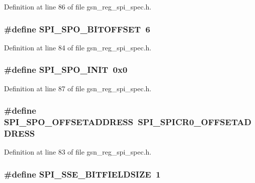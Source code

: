 Definition at line 86 of file gsn\_\-reg\_\-spi\_\-spec.h.

\hypertarget{a00573_afad8700e3398535ed93efcd17d5f81d0}{
\subsubsection[{SPI\_\-SPO\_\-BITOFFSET}]{\setlength{\rightskip}{0pt plus 5cm}\#define SPI\_\-SPO\_\-BITOFFSET~6}}
\label{a00573_afad8700e3398535ed93efcd17d5f81d0}


Definition at line 84 of file gsn\_\-reg\_\-spi\_\-spec.h.

\hypertarget{a00573_ad2263aff8d70935c03305fd06c6724b4}{
\subsubsection[{SPI\_\-SPO\_\-INIT}]{\setlength{\rightskip}{0pt plus 5cm}\#define SPI\_\-SPO\_\-INIT~0x0}}
\label{a00573_ad2263aff8d70935c03305fd06c6724b4}


Definition at line 87 of file gsn\_\-reg\_\-spi\_\-spec.h.

\hypertarget{a00573_a82072330df5e7554bc2aa751a36dbbef}{
\subsubsection[{SPI\_\-SPO\_\-OFFSETADDRESS}]{\setlength{\rightskip}{0pt plus 5cm}\#define SPI\_\-SPO\_\-OFFSETADDRESS~SPI\_\-SPICR0\_\-OFFSETADDRESS}}
\label{a00573_a82072330df5e7554bc2aa751a36dbbef}


Definition at line 83 of file gsn\_\-reg\_\-spi\_\-spec.h.

\hypertarget{a00573_afcf7eb20c32844bb6982d808778b27fb}{
\subsubsection[{SPI\_\-SSE\_\-BITFIELDSIZE}]{\setlength{\rightskip}{0pt plus 5cm}\#define SPI\_\-SSE\_\-BITFIELDSIZE~1}}
\label{a00573_afcf7eb20c32844bb6982d808778b27fb}


